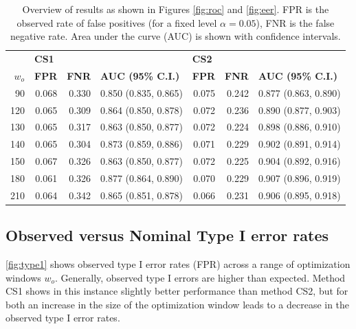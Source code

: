\documentclass[12pt]{article}
\begin{document}
\begin{table}[hbtp]
\centering
\begin{adjustbox}{max width=\textwidth}
\begin{tabular}{rrrlrrl}
  \hline
  & \multicolumn{3}{l}{\bf CS1} & \multicolumn{3}{l}{\bf CS2} \\
$w_o$ & \bf FPR & \bf FNR & \bf AUC (95\% C.I.) & \bf FPR & \bf FNR & \bf AUC (95\% C.I.) \\ 
  \hline
90 & 0.068 & 0.330 & 0.850 (0.835, 0.865) & 0.075 & 0.242 & 0.877 (0.863, 0.890) \\ 
  120 & 0.065 & 0.309 & 0.864 (0.850, 0.878) & 0.072 & 0.236 & 0.890 (0.877, 0.903) \\ 
  130 & 0.065 & 0.317 & 0.863 (0.850, 0.877) & 0.072 & 0.224 & 0.898 (0.886, 0.910) \\ 
  140 & 0.065 & 0.304 & 0.873 (0.859, 0.886) & 0.071 & 0.229 & 0.902 (0.891, 0.914) \\ 
  150 & 0.067 & 0.326 & 0.863 (0.850, 0.877) & 0.072 & 0.225 & 0.904 (0.892, 0.916) \\ 
  180 & 0.061 & 0.326 & 0.877 (0.864, 0.890) & 0.070 & 0.229 & 0.907 (0.896, 0.919) \\ 
  210 & 0.064 & 0.342 & 0.865 (0.851, 0.878) & 0.066 & 0.231 & 0.906 (0.895, 0.918) \\ 
   \hline
\end{tabular}
\end{adjustbox}
\caption{\label{tab:aucs} Overview of results as shown in Figures \ref{fig:roc} and \ref{fig:eer}. FPR is the observed rate of false positives (for a fixed level $\alpha = 0.05$), FNR is the false negative rate. Area under the curve (AUC) is shown with confidence intervals. }
\end{table}

\subsection{Observed versus Nominal Type I error
rates}\label{observed-versus-nominal-type-i-error-rates}

\autoref{fig:type1} shows observed type I error rates (FPR) across a
range of optimization windows \(w_o\). Generally, observed type I errors
are higher than expected. Method CS1 shows in this instance slightly
better performance than method CS2, but for both an increase in the size
of the optimization window leads to a decrease in the observed type I
error rates.
\end{document}
